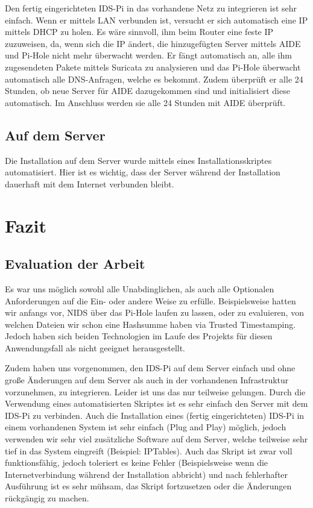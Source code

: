 \documentclass{article}
\begin{document}
Den fertig eingerichteten IDS-Pi in das vorhandene Netz zu integrieren ist sehr einfach. Wenn er mittels LAN verbunden ist, versucht er sich automatisch eine IP mittels DHCP zu holen. Es wäre sinnvoll, ihm beim Router eine feste IP zuzuweisen, da, wenn sich die IP ändert, die hinzugefügten Server mittels AIDE und Pi-Hole nicht mehr überwacht werden. Er fängt automatisch an, alle ihm zugesendeten Pakete mittels Suricata zu analysieren und das Pi-Hole überwacht automatisch alle DNS-Anfragen, welche es bekommt. Zudem überprüft er alle 24 Stunden, ob neue Server für AIDE dazugekommen sind und initialisiert diese automatisch. Im Anschluss werden sie alle 24 Stunden mit AIDE überprüft.

\subsection{Auf dem Server}
Die Installation auf dem Server wurde mittels eines Installationsskriptes automatisiert. Hier ist es wichtig, dass der Server während der Installation dauerhaft mit dem Internet verbunden bleibt.

\section{Fazit}

\subsection{Evaluation der Arbeit}
Es war uns möglich sowohl alle Unabdinglichen, als auch alle Optionalen Anforderungen auf die Ein- oder andere Weise zu erfülle. Beispielsweise hatten wir anfangs vor, NIDS über das Pi-Hole laufen zu lassen, oder zu evaluieren, von welchen Dateien wir schon eine Hashsumme haben via Trusted Timestamping. Jedoch haben sich beiden Technologien im Laufe des Projekts für diesen Anwendungsfall als nicht geeignet herausgestellt.

Zudem haben uns vorgenommen, den IDS-Pi auf dem Server einfach und ohne große Änderungen auf dem Server als auch in der vorhandenen Infrastruktur vorzunehmen, zu integrieren. Leider ist uns das nur teilweise gelungen. Durch die Verwendung eines automatisierten Skriptes ist es sehr einfach den Server mit dem IDS-Pi zu verbinden. Auch die Installation eines (fertig eingerichteten) IDS-Pi in einem vorhandenen System ist sehr einfach (Plug and Play) möglich, jedoch verwenden wir sehr viel zusätzliche Software auf dem Server, welche teilweise sehr tief in das System eingreift (Beispiel: IPTables). Auch das Skript ist zwar voll funktionsfähig, jedoch toleriert es keine Fehler (Beispielsweise wenn die Internetverbindung während der Installation abbricht) und nach fehlerhafter Ausführung ist es sehr mühsam, das Skript fortzusetzen oder die Änderungen rückgängig zu machen.
\end{document}
